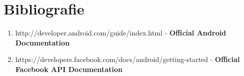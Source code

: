 \documentclass[12pt]{article}
\begin{document}
\section*{Bibliografie}
\begin{enumerate}
\item http://developer.android.com/guide/index.html - \textbf{Official Android Documentation}
\item https://developers.facebook.com/docs/android/getting-started - \textbf{Official Facebook API Documentation}
\end{enumerate}
\end{document}
